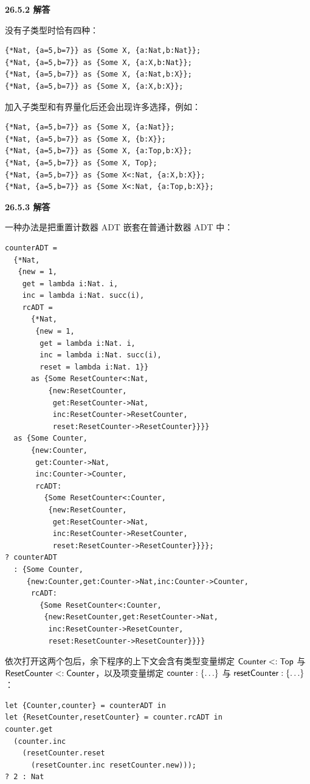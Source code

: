 \begin{taplauthorsolutionentrybox}
\label{sol:author:26.5.2}
\textbf{26.5.2 解答}

没有子类型时恰有四种：
\begin{lstlisting}
{*Nat, {a=5,b=7}} as {Some X, {a:Nat,b:Nat}};
{*Nat, {a=5,b=7}} as {Some X, {a:X,b:Nat}};
{*Nat, {a=5,b=7}} as {Some X, {a:Nat,b:X}};
{*Nat, {a=5,b=7}} as {Some X, {a:X,b:X}};
\end{lstlisting}
加入子类型和有界量化后还会出现许多选择，例如：
\begin{lstlisting}
{*Nat, {a=5,b=7}} as {Some X, {a:Nat}};
{*Nat, {a=5,b=7}} as {Some X, {b:X}};
{*Nat, {a=5,b=7}} as {Some X, {a:Top,b:X}};
{*Nat, {a=5,b=7}} as {Some X, Top};
{*Nat, {a=5,b=7}} as {Some X<:Nat, {a:X,b:X}};
{*Nat, {a=5,b=7}} as {Some X<:Nat, {a:Top,b:X}};
\end{lstlisting}
\end{taplauthorsolutionentrybox}

\begin{taplauthorsolutionentrybox}
\label{sol:author:26.5.3}
\textbf{26.5.3 解答}

一种办法是把重置计数器 ADT 嵌套在普通计数器 ADT 中：
\begin{lstlisting}
counterADT =
  {*Nat,
   {new = 1,
    get = lambda i:Nat. i,
    inc = lambda i:Nat. succ(i),
    rcADT =
      {*Nat,
       {new = 1,
        get = lambda i:Nat. i,
        inc = lambda i:Nat. succ(i),
        reset = lambda i:Nat. 1}}
      as {Some ResetCounter<:Nat,
          {new:ResetCounter,
           get:ResetCounter->Nat,
           inc:ResetCounter->ResetCounter,
           reset:ResetCounter->ResetCounter}}}}
  as {Some Counter,
      {new:Counter,
       get:Counter->Nat,
       inc:Counter->Counter,
       rcADT:
         {Some ResetCounter<:Counter,
          {new:ResetCounter,
           get:ResetCounter->Nat,
           inc:ResetCounter->ResetCounter,
           reset:ResetCounter->ResetCounter}}}};
? counterADT
  : {Some Counter,
     {new:Counter,get:Counter->Nat,inc:Counter->Counter,
      rcADT:
        {Some ResetCounter<:Counter,
         {new:ResetCounter,get:ResetCounter->Nat,
          inc:ResetCounter->ResetCounter,
          reset:ResetCounter->ResetCounter}}}}
\end{lstlisting}
依次打开这两个包后，余下程序的上下文会含有类型变量绑定
\(\mathsf{Counter}<:\mathsf{Top}\) 与
\(\mathsf{ResetCounter}<:\mathsf{Counter}\)，以及项变量绑定
\(\mathsf{counter}:\{\ldots\}\) 与
\(\mathsf{resetCounter}:\{\ldots\}\)：
\begin{lstlisting}
let {Counter,counter} = counterADT in
let {ResetCounter,resetCounter} = counter.rcADT in
counter.get
  (counter.inc
    (resetCounter.reset
      (resetCounter.inc resetCounter.new)));
? 2 : Nat
\end{lstlisting}
\end{taplauthorsolutionentrybox}

